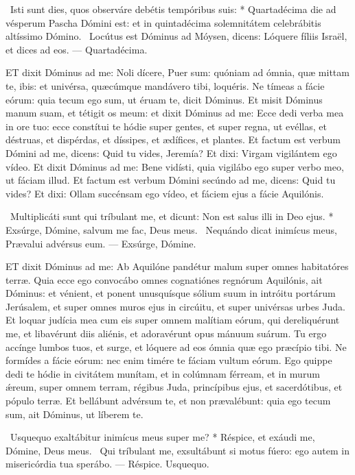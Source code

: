 \R\ Isti sunt dies, quos observáre debétis tempóribus suis: * Quartadécima die ad vésperum Pascha Dómini est: et in quintadécima solemnitátem celebrábitis altíssimo Dómino. \V\ Locútus est Dóminus ad Móysen, dicens: Lóquere fíliis Israël, et dices ad eos. --- Quartadécima.


\lettrine[lines=2]{E}{T} dixit Dóminus ad me: Noli dícere, Puer sum: quóniam ad ómnia, quæ mittam te, ibis: et univérsa, quæcúmque mandávero tibi, loquéris. Ne tímeas a fácie eórum: quia tecum ego sum, ut éruam te, dicit Dóminus. Et misit Dóminus manum suam, et tétigit os meum: et dixit Dóminus ad me: Ecce dedi verba mea in ore tuo: ecce constítui te hódie super gentes, et super regna, ut evéllas, et déstruas, et dispérdas, et díssipes, et ædífices, et plantes. Et factum est verbum Dómini ad me, dicens: Quid tu vides, Jeremía? Et dixi: Virgam vigilántem ego vídeo. Et dixit Dóminus ad me: Bene vidísti, quia vigilábo ego super verbo meo, ut fáciam illud. Et factum est verbum Dómini secúndo ad me, dicens: Quid tu vides? Et dixi: Ollam succénsam ego vídeo, et fáciem ejus a fácie Aquilónis.

\R\ Multiplicáti sunt qui tríbulant me, et dicunt: Non est salus illi in Deo ejus. * Exsúrge, Dómine, salvum me fac, Deus meus. \V\ Nequándo dicat inimícus meus, Prævalui advérsus eum. --- Exsúrge, Dómine.


\lettrine[lines=2]{E}{T} dixit Dóminus ad me: Ab Aquilóne pandétur malum super omnes habitatóres terræ. Quia ecce ego convocábo omnes cognatiónes regnórum Aquilónis, ait Dóminus: et vénient, et ponent unusquísque sólium suum in intróitu portárum Jerúsalem, et super omnes muros ejus in circúitu, et super univérsas urbes Juda. Et loquar judícia mea cum eis super omnem malítiam eórum, qui dereliquérunt me, et libavérunt diis aliénis, et adoravérunt opus mánuum suárum. Tu ergo accínge lumbos tuos, et surge, et lóquere ad eos ómnia quæ ego præcípio tibi. Ne formídes a fácie eórum: nec enim timére te fáciam vultum eórum. Ego quippe dedi te hódie in civitátem munítam, et in colúmnam férream, et in murum ǽreum, super omnem terram, régibus Juda, princípibus ejus, et sacerdótibus, et pópulo terræ. Et bellábunt advérsum te, et non prævalébunt: quia ego tecum sum, ait Dóminus, ut líberem te.

\R\ Usquequo exaltábitur inimícus meus super me? * Réspice, et exáudi me, Dómine, Deus meus. \V\ Qui tríbulant me, exsultábunt si motus fúero: ego autem in misericórdia tua sperábo. --- Réspice. Usquequo.

